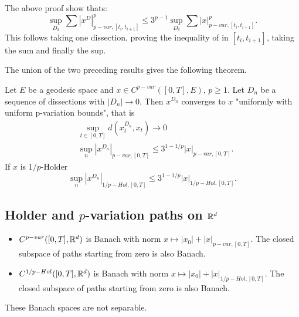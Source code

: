 \begin{observation}
    The above proof show thats:
    \begin{equation}
        \sup_{D_\delta} \sum |x^D|^p_{p-var,[t_i, t_{i+1}]} \leq 3^{p-1} \sup_{D_\delta} \sum |x|^p_{p-var,[t_i, t_{i+1}]}.
    \end{equation}
    This follows taking one dissection, proving the inequality of in $[t_i, t_{i+1}]$, taking the sum and finally the sup.
\end{observation}
The union of the two preceding results gives the following theorem.

\begin{theorem}
    Let $E$ be a geodesic space and $x \in C^{p-var}([0,T],E)$, $p \ge 1$. Let $D_n$ be a sequence of dissections with $|D_n| \rightarrow 0$.
    Then $x^{D_n}$ converges to $x$ "uniformly with uniform p-variation bounds", that is
    \begin{align}
        &\sup_{t \in [0,T]} d \left( x_t^{D_n}, x_t \right) \rightarrow 0 \\
        &\sup_n |x^{D_n}|_{p-var, [0,T]} \le 3^{1 - 1/p} |x|_{p-var, [0,T]}.
    \end{align}
    If $x$ is $1/p$-Holder
    \begin{equation}
        \sup_n |x^{D_n}|_{1/p-Hol, [0,T]} \le 3^{1 - 1/p} |x|_{1/p-Hol, [0,T]}.
    \end{equation}
\end{theorem}

\subsection{Holder and $p$-variation paths on $\mathbb{R}^d$}

\begin{theorem}
    \begin{itemize}
        \item $C^{p-var}([0,T], \mathbb{R}^d)$ is Banach with norm $x \mapsto |x_0| + |x|_{p-var,[0,T]}.$ The closed subspace of paths starting from zero is also Banach.
        \item $C^{1/p-Hol}([0,T], \mathbb{R}^d)$ is Banach with norm  $x \mapsto |x_0| + |x|_{1/p-Hol,[0,T]}.$ The closed subspace of paths starting from zero is also Banach.
    \end{itemize}
    These Banach spaces are not separable.
\end{theorem}


